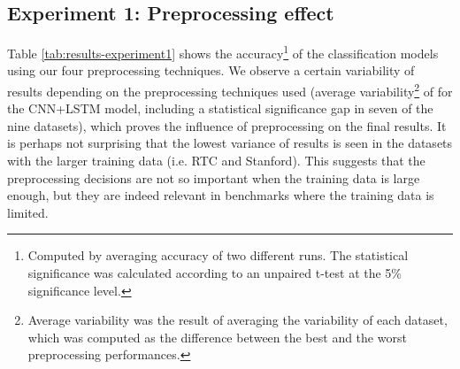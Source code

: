 \documentclass[11pt,a4paper]{article}
\begin{document}
\begin{table*}[t]
\begin{center}
{\begin{tabular}{c c l c  c  c  c c c c c c}
       \bottomrule
       
    \end{tabular}
    }
    \end{center}
    \caption{Accuracy on the topic categorization and polarity detection tasks using various preprocessing techniques for the CNN and CNN+LSTM models.  indicates results that are statistically significant with respect to the top result. }
    \bigskip
    \label{tab:results-experiment1}
\end{table*}













\subsection{Experiment 1: Preprocessing effect}
\label{experiment1}


Table \ref{tab:results-experiment1} shows the accuracy\footnote{Computed by averaging accuracy of two different runs. The statistical significance was calculated according to an unpaired t-test at the 5\% significance level.} of the classification models using our four preprocessing techniques. 
We observe a certain variability of results depending on the preprocessing techniques used (average variability\footnote{Average variability was the result of averaging the variability of each dataset, which was computed as the difference between the best and the worst preprocessing performances.} of  for the CNN+LSTM model, including a statistical significance gap in seven of the nine datasets), which proves the influence of preprocessing on the final results. It is perhaps not surprising that the lowest variance of results is seen in the datasets with the larger training data (i.e. RTC and Stanford). This suggests that the preprocessing decisions are not so important when the training data is large enough, but they are indeed relevant in benchmarks where the training data is limited.
\end{document}
